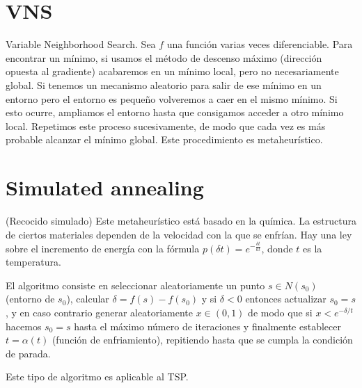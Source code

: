 \documentclass[AL.tex]{subfiles}
\begin{document}
\section{VNS}
Variable Neighborhood Search. Sea $f$ una función varias veces diferenciable. Para encontrar un mínimo, si usamos el método de descenso máximo (dirección opuesta al gradiente) acabaremos en un mínimo local, pero no necesariamente global. Si tenemos un mecanismo aleatorio para salir de ese mínimo en un entorno pero el entorno es pequeño volveremos a caer en el mismo mínimo. Si esto ocurre, ampliamos el entorno hasta que consigamos acceder a otro mínimo local. Repetimos este proceso sucesivamente, de modo que cada vez es más probable alcanzar el mínimo global. Este procedimiento es metaheurístico.


\section{Simulated annealing}
(Recocido simulado) Este metaheurístico está basado en la química. La estructura de ciertos materiales dependen de la velocidad con la que se enfrían. Hay una ley sobre el incremento de energía con la fórmula $p(\delta t)=e^{-\frac{\delta t}{kt}}$, donde $t$ es la temperatura. 

El algoritmo consiste en seleccionar aleatoriamente un punto $s\in N(s_0)$ (entorno de $s_0$), calcular $\delta=f(s)-f(s_0)$ y si $\delta<0$ entonces actualizar $s_0=s$, y en caso contrario generar aleatoriamente $x\in(0,1)$ de modo que si $x< e^{-\delta/t}$ hacemos $s_0=s$ hasta el máximo número de iteraciones y finalmente establecer $t=\alpha(t)$ (función de enfriamiento), repitiendo hasta que se cumpla la condición de parada. 

Este tipo de algoritmo es aplicable al TSP. 
\end{document}
